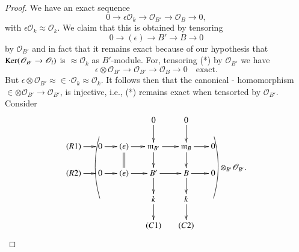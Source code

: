 {\begin{proof}
We have an exact sequence
$$
0\to \epsilon \mathscr{O}_{k}\to \mathscr{O}_{B'}\to \mathscr{O}_{B}\to 0,
$$
with $\epsilon \mathscr{O}_{k}\approx \mathscr{O}_k$. We claim that
this is obtained by tensoring 
\begin{equation*}
0\to (\epsilon)\to B'\to B\to 0\tag{*}
\end{equation*}
by $\mathscr{O}_{B'}$ and in fact that it remains exact because of our
hypothesis that $\operatorname{Ker}(\mathscr{O}_{B'}\to \mathscr{O}_{l})$ is
$\approx \mathscr{O}_{k}$ as $B'$-module. For, tensoring (*) by
$\mathscr{O}_{B'}$ we have 
$$
\epsilon \otimes \mathscr{O}_{B'}\to \mathscr{O}_{B'}\to \mathscr{O}_{B}\to
0\quad\text{exact}. 
$$\pageoriginale
But
$\epsilon \otimes \mathscr{O}_{B'}\approx \in \cdot \mathscr{O}_{k}\approx \mathscr{O}_{k}$. It
follows then that the canonical - homomorphism
$\in \otimes \mathscr{O}_{B'}\to \mathscr{O}_{B'}$, is injective,
i.e., (*) remains exact when tensorted by $\mathscr{O}_{B'}$. Consider 
\[
\xymatrix@R=.2cm@C=.5cm{
 & & & 0\ar[dd] & 0\ar[dd] & \\
 & \ar@/_/@{-}[ddddd] & & &
 & \ar@/^/@{-}[ddddd]^-{\displaystyle\otimes_{B'}\mathscr{O}_{B'}.}\\ 
(R1)\ar [r]& 0\ar[r]& (\epsilon)\ar@
 {=}[dd]\ar[r]&\mathfrak{m}_{B'}\ar [dd]\ar[r]&\mathfrak{m}_{B}\ar
 [dd]\ar[r]& 0\\ 
&&&&&\\
(R2)\ar [r] & 0\ar [r] &(\epsilon)\ar [r] & B'\ar [dd]\ar [r]& B\ar [dd] \ar [r]& 0\\
& & & & &\\
& & & k\ar[dd] & k\ar[dd] &\\
& & & & &\\
& & & (C1) & (C2) &
}
\]


\end{proof}}
